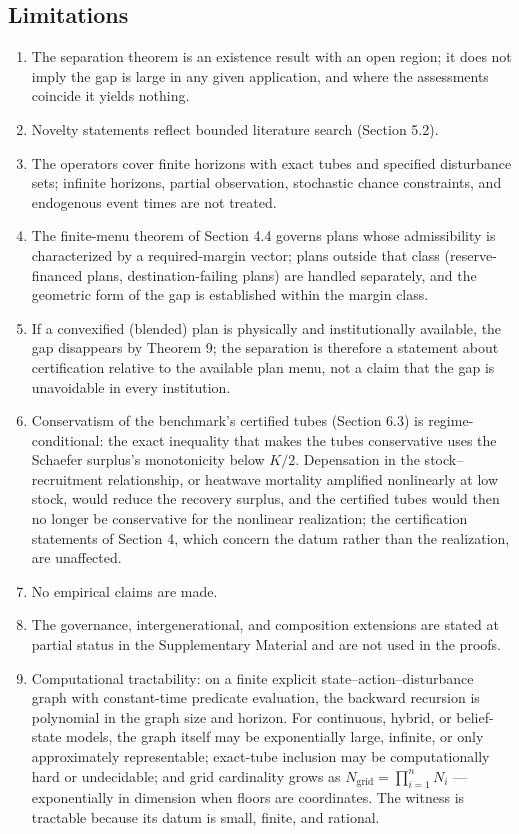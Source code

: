 \documentclass[3p,11pt]{elsarticle}
\providecommand{\tightlist}{\setlength{\itemsep}{0pt}\setlength{\parskip}{0pt}}
\begin{document}
\subsection{Limitations}\label{limitations}

\begin{enumerate}
\def\labelenumi{(\roman{enumi})}
\tightlist
\item
  The separation theorem is an existence result with an open region; it does not imply the gap is large in any given application, and where the assessments coincide it yields nothing.
\item
  Novelty statements reflect bounded literature search (Section 5.2).
\item
  The operators cover finite horizons with exact tubes and specified disturbance sets; infinite horizons, partial observation, stochastic chance constraints, and endogenous event times are not treated.
\item
  The finite-menu theorem of Section 4.4 governs plans whose admissibility is characterized by a required-margin vector; plans outside that class (reserve-financed plans, destination-failing plans) are handled separately, and the geometric form of the gap is established within the margin class.
\item
  If a convexified (blended) plan is physically and institutionally available, the gap disappears by Theorem 9; the separation is therefore a statement about certification relative to the available plan menu, not a claim that the gap is unavoidable in every institution.
\item
  Conservatism of the benchmark's certified tubes (Section 6.3) is
  regime-conditional: the exact inequality that makes the tubes
  conservative uses the Schaefer surplus's monotonicity below \(K/2\).
  Depensation in the stock--recruitment relationship, or heatwave
  mortality amplified nonlinearly at low stock, would reduce the recovery
  surplus, and the certified tubes would then no longer be conservative
  for the nonlinear realization; the certification statements of
  Section 4, which concern the datum rather than the realization, are
  unaffected.
\item
  No empirical claims are made.
\item
  The governance, intergenerational, and composition extensions are stated at partial status in the Supplementary Material and are not used in the proofs.
\item
  Computational tractability: on a finite explicit state--action--disturbance graph with constant-time predicate evaluation, the backward recursion is polynomial in the graph size and horizon. For continuous, hybrid, or belief-state models, the graph itself may be exponentially large, infinite, or only approximately representable; exact-tube inclusion may be computationally hard or undecidable; and grid cardinality grows as \(N_{\mathrm{grid}} = \prod_{i=1}^n N_i\) --- exponentially in dimension when floors are coordinates. The witness is tractable because its datum is small, finite, and rational.
\end{enumerate}
\end{document}

